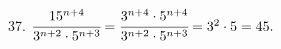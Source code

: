 37. $\cfrac{15^{n+4}}{3^{n+2}\cdot5^{n+3}}=\cfrac{3^{n+4}\cdot5^{n+4}}{3^{n+2}\cdot5^{n+3}}=3^2\cdot5=45.$\\

